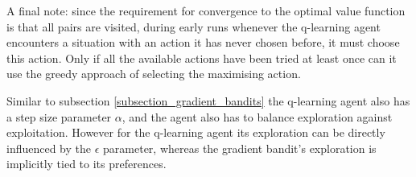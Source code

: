 A final note: since the requirement for convergence to the optimal value function is that all pairs are visited, during early runs whenever the q-learning agent encounters a situation with an action it has never chosen before, it must choose this action. Only if all the available actions have been tried at least once can it use the greedy approach of selecting the maximising action.

Similar to subsection \ref{subsection_gradient_bandits} the q-learning agent also has a step size parameter $\alpha$, and the agent also has to balance exploration against exploitation. However for the q-learning agent its exploration can be directly influenced by the $\epsilon$ parameter, whereas the gradient bandit’s exploration is implicitly tied to its preferences.

